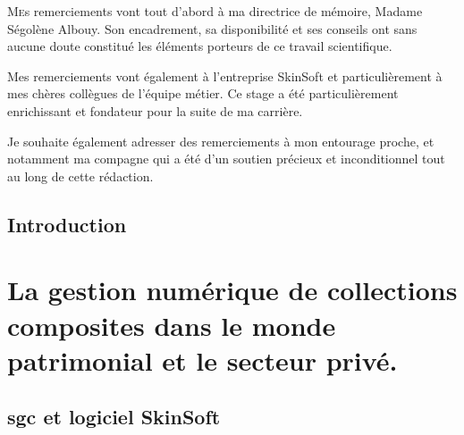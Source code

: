 \documentclass[12pt,twoside]{book}
\begin{document}
\lettrine{M}es remerciements vont tout d'abord à ma directrice de mémoire, Madame Ségolène Albouy. Son encadrement, sa disponibilité et ses conseils ont sans aucune doute constitué les éléments porteurs de ce travail scientifique.\newline

Mes remerciements vont également à l'entreprise SkinSoft et particulièrement à mes chères collègues de l'équipe métier. Ce stage a été particulièrement enrichissant et fondateur pour la suite de ma carrière.\newline

Je souhaite également adresser des remerciements à mon entourage proche, et notamment ma compagne qui a été d'un soutien précieux et inconditionnel tout au long de cette rédaction.
	\newpage{\pagestyle{empty}\cleardoublepage}
	

\nocite{*} %
\printbibliography[title={Bibliographie exhaustive}] %

\chapter{Introduction}	




\newpage{\pagestyle{empty}\cleardoublepage}

	\mainmatter

	

	\part{La gestion numérique de collections composites dans le monde patrimonial et le secteur privé.}
	
\chapter[\Gls{sgc} et SkinSoft]{\Gls{sgc} et logiciel SkinSoft}
\end{document}
